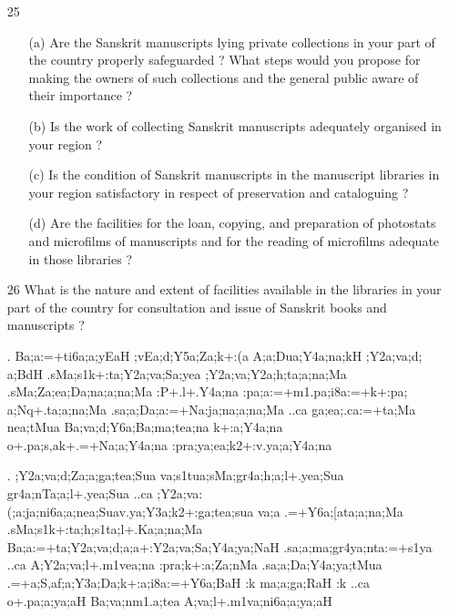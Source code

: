 {\begin{itemize}
\item[25] \begin{itemize}
           
           \item[(a)] Are the Sanskrit manuscripts lying private collections in your part of the country properly safeguarded ? What steps would you propose for making the owners of such collections and the general public aware of their importance ?
           
           \item[(b)] Is the work of collecting Sanskrit manuscripts adequately organised in your region ?
           
           \item[(c)] Is the condition of Sanskrit manuscripts in the manuscript libraries in your region satisfactory in respect of preservation and cataloguing ?
           
           \item[(d)] Are the facilities for the loan, copying, and preparation of photostats and microfilms of manuscripts and for the reading of microfilms adequate in those libraries ?
           
           \end{itemize} 

			\item[26] What is the nature and extent of facilities available in the libraries in your part of the country for consultation and issue of Sanskrit books and manuscripts ?
\end{itemize}
}

\begin{itemize}
\item[{\sktf 27}.] {\sktf Ba;a:=+ti6a;a;yEaH
;vEa;d;Y5a;Za;k+:(a
A;a;Dua;Y4a;na;kH ;Y2a;va;d;%
a;BdH .sMa;s1k+:ta;Y2a;va;Sa;yea
;Y2a;va;Y2a;h;ta;a;na;Ma .sMa;Za;ea;Da;na;a;na;Ma :P+.l+.Y4a;na \ZF{)} :pa;a:=+m1.pa;i8a:=+k+:pa;%
a;Nq+.ta;a;na;Ma \ZF{)}
.sa;a;Da;a:=+Na:ja;na;a;na;Ma ..ca ga;ea;.ca:=+ta;Ma nea;tMua
Ba;va;d;Y6a;Ba;ma;tea;na k+:a;Y4a;na o+.pa;s,ak+.=+Na;a;Y4a;na :pra;ya;ea;k2+:v.ya;a;Y4a;na}

\item[{\sktf 28}.] {\sktf ;Y2a;va;d;Za;a;ga;tea;Sua
va;s1tua;sMa;gr4a;h;a;l+.yea;Sua gr4a;nTa;a;l+.yea;Sua ..ca
\ZF{(};Y2a;va:(;a:ja;ni6a;a;nea;Sua\break v.ya;Y3a;k2+:ga;tea;sua
va;a\ZF{)} .=+Y6a;[ata;a;na;Ma .sMa;s1k+:ta;h;s1ta;l+.Ka;a;na;Ma%
\ZF{,} Ba;a:=+ta;Y2a;va;d;a;a\ZF{-}+:Y2a;va;Sa;Y4a;ya;NaH
.sa;a;ma;gr4ya;nta:=+s1ya ..ca\ZF{,} A;Y2a;va;l+.m1vea;na :pra;k+:a;Za;nMa
.sa;a;Da;Y4a;ya;tMua .=+a;S,af;a;Y3a;Da;k+:a;i8a:=+Y6a;BaH :k
ma;a;ga;RaH :k ..ca o+.pa;a;ya;aH
Ba;va;nm1.a;tea A;va;l+.m1va;ni6a;a;ya;aH}

\end{itemize}

